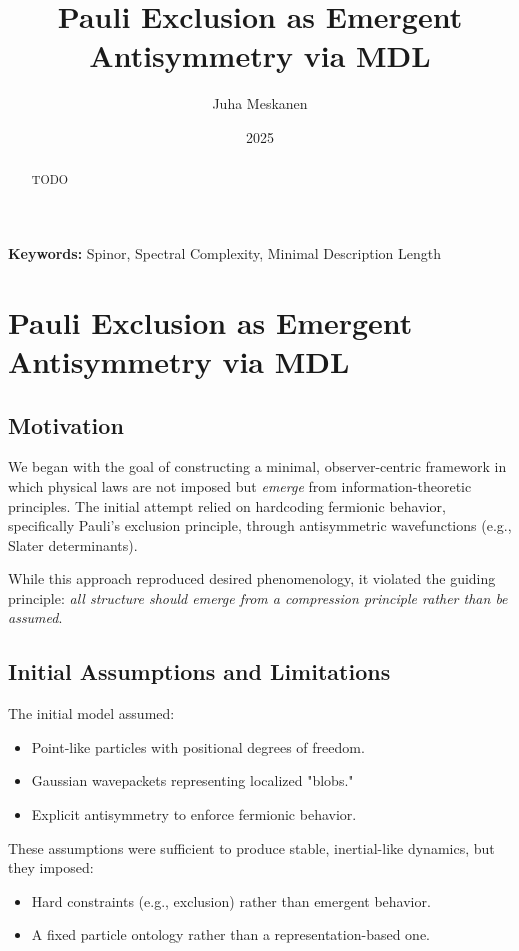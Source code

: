 \documentclass[11pt]{article}
\title{Pauli Exclusion as Emergent Antisymmetry via MDL}
\author{Juha Meskanen}
\date{2025}
\begin{document}
\maketitle

\begin{abstract}
TODO
\end{abstract}

\noindent \textbf{Keywords:} Spinor, Spectral Complexity, Minimal Description Length

\tableofcontents
\bigskip

\section{Pauli Exclusion as Emergent Antisymmetry via MDL}

\subsection{Motivation}

We began with the goal of constructing a minimal, observer-centric framework in which physical laws are not imposed but \emph{emerge} from information-theoretic principles. The initial attempt relied on hardcoding fermionic behavior, specifically Pauli's exclusion principle, through antisymmetric wavefunctions (e.g., Slater determinants).

While this approach reproduced desired phenomenology, it violated the guiding principle: \emph{all structure should emerge from a compression principle rather than be assumed}.


\subsection{Initial Assumptions and Limitations}

The initial model assumed:
\begin{itemize}
    \item Point-like particles with positional degrees of freedom.
    \item Gaussian wavepackets representing localized "blobs."
    \item Explicit antisymmetry to enforce fermionic behavior.
\end{itemize}

These assumptions were sufficient to produce stable, inertial-like dynamics, but they imposed:
\begin{itemize}
    \item Hard constraints (e.g., exclusion) rather than emergent behavior.
    \item A fixed particle ontology rather than a representation-based one.
\end{itemize}
\end{document}
